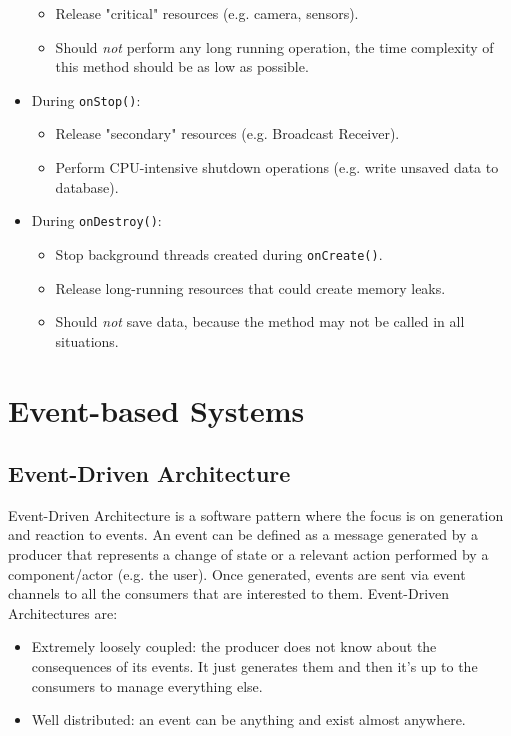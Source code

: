 \documentclass[11pt,a4paper,notitlepage]{article}
\begin{document}
\begin{itemize}
\begin{itemize}
		\item Release "critical" resources (e.g. camera, sensors).
		\item Should \textit{not} perform any long running operation, the time complexity of this method should be as low as possible.
	\end{itemize}
	\item During \texttt{onStop()}:
	\begin{itemize}
		\item Release "secondary" resources (e.g. Broadcast Receiver).
		\item Perform CPU-intensive shutdown operations (e.g. write unsaved data to database).
	\end{itemize}
	\item During \texttt{onDestroy()}:
	\begin{itemize}
		\item Stop background threads created during \texttt{onCreate()}.
		\item Release long-running resources that could create memory leaks.
		\item Should \textit{not} save data, because the method may not be called in all situations.
	\end{itemize}

\end{itemize}

\section{Event-based Systems}

\subsection{Event-Driven Architecture}
Event-Driven Architecture is a software pattern where the focus is on generation and reaction to events. An event can be defined as a message generated by a producer that represents a change of state or a relevant action performed by a component/actor (e.g. the user). Once generated, events are sent via event channels to all the consumers that are interested to them. Event-Driven Architectures are:
\begin{itemize}
	\item Extremely loosely coupled: the producer does not know about the consequences of its events. It just generates them and then it's up to the consumers to manage everything else.
	\item Well distributed: an event can be anything and exist almost anywhere.
\end{itemize}
\end{document}
